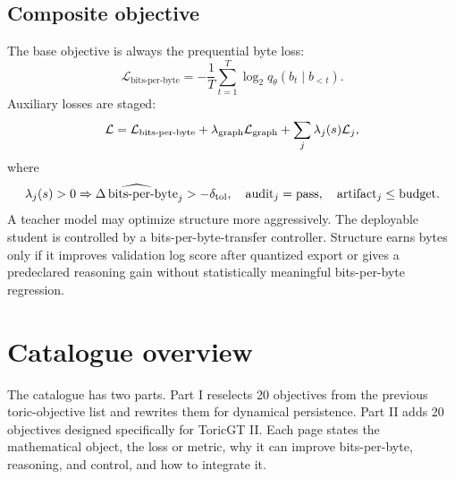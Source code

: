 \documentclass[10pt]{article}
\newcommand{\bitsperbyte}{\operatorname{bits\text{-}per\text{-}byte}}
\newcommand{\loss}{\mathcal{L}}
\numberwithin{equation}{section}
\begin{document}
\subsection{Composite objective}
The base objective is always the prequential byte loss:
\begin{equation}
\loss_{\bitsperbyte}=-\frac1T\sum_{t=1}^T\log_2 q_\theta(b_t\mid b_{<t}).
\end{equation}
Auxiliary losses are staged:
\begin{equation}
\loss=\loss_{\bitsperbyte}+\lambda_{\rm graph}\loss_{\rm graph}+\sum_j \lambda_j(s)\loss_j,
\end{equation}
where
\begin{equation}
\lambda_j(s)>0\Rightarrow \widehat{\Delta\bitsperbyte}_j> -\delta_{\rm tol},\quad \mathrm{audit}_j=\mathrm{pass},\quad \mathrm{artifact}_j\le \mathrm{budget}.
\end{equation}
A teacher model may optimize structure more aggressively. The deployable student is controlled by a bits-per-byte-transfer controller. Structure earns bytes only if it improves validation log score after quantized export or gives a predeclared reasoning gain without statistically meaningful bits-per-byte regression.

\section{Catalogue overview}
The catalogue has two parts. Part I reselects 20 objectives from the previous toric-objective list and rewrites them for dynamical persistence. Part II adds 20 objectives designed specifically for ToricGT II. Each page states the mathematical object, the loss or metric, why it can improve bits-per-byte, reasoning, and control, and how to integrate it.
\end{document}
